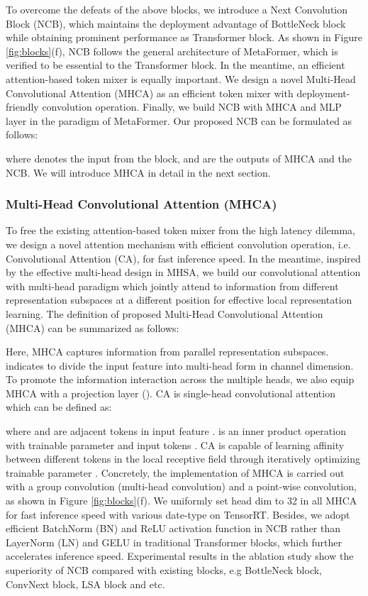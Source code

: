 \documentclass[10pt,twocolumn,letterpaper]{article}
\begin{document}
To overcome the defeats of the above blocks, we introduce a Next Convolution Block (NCB),  which maintains the deployment advantage of BottleNeck block while obtaining prominent performance as Transformer block. As shown in Figure \ref{fig:blocks}(f), NCB follows the general architecture of MetaFormer\cite{metaformer}, which is verified to be essential to the Transformer block. In the meantime, an efficient attention-based token mixer is equally important. We design a novel Multi-Head Convolutional Attention (MHCA) as an efficient token mixer with deployment-friendly convolution operation. Finally, we build NCB with MHCA and MLP layer in the paradigm of MetaFormer\cite{metaformer}. Our proposed NCB can be formulated as follows:

where  denotes the input from the  block,  and  are the outputs of MHCA and the  NCB. We will introduce MHCA in detail in the next section.




\subsubsection{Multi-Head Convolutional Attention (MHCA)}
To free the existing attention-based token mixer from the high latency dilemma, we design a novel attention mechanism with efficient convolution operation, i.e. Convolutional Attention (CA), for fast inference speed. In the meantime, inspired by the effective multi-head design in MHSA\cite{vaswani2017attention}, we build our convolutional attention with multi-head paradigm which jointly attend to information from different representation subspaces at a different position for effective local representation learning. The definition of proposed Multi-Head Convolutional Attention (MHCA) can be summarized as follows:

Here, MHCA captures information from   parallel representation subspaces.  indicates to divide the input feature  into multi-head form in channel dimension. To promote the information interaction across the multiple heads, we also equip MHCA with a projection layer ().  CA is single-head convolutional attention which can be defined as:

where  and  are adjacent tokens in input feature .  is an inner product operation with trainable parameter  and input tokens . CA is capable of learning affinity between different tokens in the local receptive field through iteratively optimizing trainable parameter . Concretely, the implementation of MHCA is carried out with a group convolution (multi-head convolution) and a point-wise convolution, as shown in Figure \ref{fig:blocks}(f). We uniformly set head dim to 32 in all MHCA for fast inference speed with various date-type on TensorRT. Besides, we adopt efficient BatchNorm (BN) and ReLU activation function in NCB rather than LayerNorm (LN) and GELU in traditional Transformer blocks, which further accelerates inference speed. Experimental results in the ablation study show the superiority of NCB compared with existing blocks, e.g BottleNeck block, ConvNext block, LSA block and etc.
\end{document}
